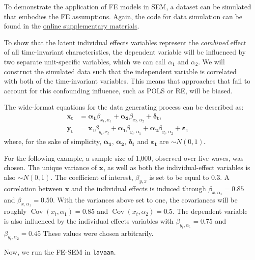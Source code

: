 \documentclass[
  12pt,
  a4paper]{article}
\DeclareMathOperator{\Cov}{\mathrm{Cov}}
\begin{document}
\singlespacing

\doublespacing

To demonstrate the application of FE models in SEM, a dataset can be
simulated that embodies the FE assumptions. Again, the code for data
simulation can be found in the
\href{https://github.com/henrik-andersen/FE-SEM/blob/master/simulation-code.R}{online
supplementary materials}.

To show that the latent individual effects variables represent the
\emph{combined} effect of all time-invariant characteristics, the
dependent variable will be influenced by two separate unit-specific
variables, which we can call \(\alpha_{1}\) and \(\alpha_{2}\). We will
construct the simulated data such that the independent variable is
correlated with both of the time-invariant variables. This means that
approaches that fail to account for this confounding influence, such as
POLS or RE, will be biased.

The wide-format equations for the data generating process can be
described as: \begin{align}
\bm{x_{t}} & = \bm{\alpha_{1}}\beta_{x_{t},\alpha_{1}} + \bm{\alpha_{2}}\beta_{x_{t},\alpha_{2}} + \bm{\delta_{t}}, \\
\bm{y_{t}} & = \bm{x_{t}}\beta_{y_{t},x_{t}} + \bm{\alpha_{1}}\beta_{y_{t},\alpha_{1}} + \bm{\alpha_{2}} \beta_{y_{t},\alpha_{2}} + \bm{\varepsilon_{t}} 
\end{align} where, for the sake of simplicity, \(\bm{\alpha_{1}}\),
\(\bm{\alpha_{2}}\), \(\bm{\delta_{t}}\) and \(\bm{\varepsilon_{t}}\)
are \(\sim N(0,1)\).

For the following example, a sample size of 1,000, observed over five
waves, was chosen. The unique variance of \(\bm{x}\), as well as both
the individual-effect variables is also \(\sim N(0,1)\). The coefficient
of interest, \(\beta_{y,x}\) is set to be equal to \(0.3\). A
correlation between \(\bm{x}\) and the individual effects is induced
through \(\beta_{x,\alpha_{1}} = 0.85\) and
\(\beta_{x,\alpha_{1}} = 0.50\). With the variances above set to one,
the covariances will be roughly \(\Cov(x_{t},\alpha_{1}) = 0.85\) and
\(\Cov(x_{t},\alpha_{2}) = 0.5\). The dependent variable is also
influenced by the individual effects variables with
\(\beta_{y_{t},\alpha_{1}} = 0.75\) and
\(\beta_{y_{t},\alpha_{2}} = 0.45\) These values were chosen
arbitrarily.

Now, we run the FE-SEM in \texttt{lavaan}.

\singlespacing
\end{document}
